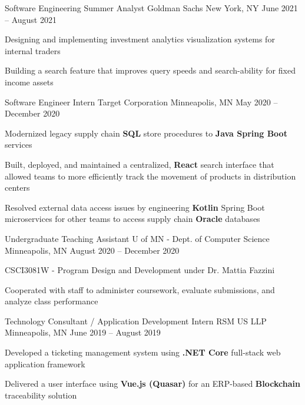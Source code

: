 \documentclass[]{awesome-cv}
\begin{document}
\vspace{-9mm}
\begin{cventries}
    \cventry
	{Software Engineering Summer Analyst}
	{Goldman Sachs}
	{New York, NY}
	{June 2021 – August 2021}
	{\begin{cvitems}
		\item {Designing and implementing investment analytics visualization systems for internal traders}
		\item {Building a search feature that improves query speeds and search-ability for fixed income assets}
		\end{cvitems}}
	\cventry
	{Software Engineer Intern}
	{Target Corporation}
	{Minneapolis, MN}
	{May 2020 – December 2020}
	{\begin{cvitems}
		\item {Modernized legacy supply chain \textbf{SQL} store procedures to \textbf{Java Spring Boot} services}
		\item {Built, deployed, and maintained a centralized, \textbf{React} search interface that allowed teams to more efficiently track the movement of products in distribution centers}
		\item {Resolved external data access issues by engineering \textbf{Kotlin} Spring Boot microservices for other teams to access supply chain \textbf{Oracle} databases}
		\end{cvitems}}
	\cventry
	{Undergraduate Teaching Assistant}
	{U of MN - Dept. of Computer Science}
	{Minneapolis, MN}
	{August 2020 – December 2020}
	{\begin{cvitems}
    	\item {CSCI3081W - Program Design and Development under Dr. Mattia Fazzini}
		\item {Cooperated with staff to administer coursework, evaluate submissions, and analyze class performance}
		\end{cvitems}}
	\cventry
	{Technology Consultant / Application Development Intern}
	{RSM US LLP}
	{Minneapolis, MN}
	{June 2019 – August 2019}
	{\begin{cvitems}
		\item {Developed a ticketing management system using  \textbf{.NET Core} full-stack web application framework}
		\item {Delivered a user interface using \textbf{Vue.js (Quasar)} for an ERP-based \textbf{Blockchain} traceability solution}
		\end{cvitems}}

\end{cventries}
\end{document}
